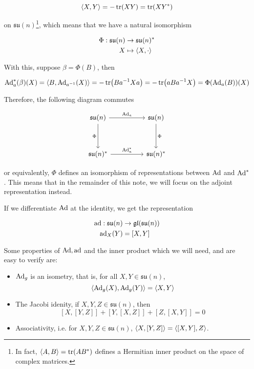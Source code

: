 \documentclass{article}
\newcommand{\su}{\mathfrak{su}}
\begin{document}
\[\left\langle X, Y \right\rangle = -\tr(XY) = \tr(XY^*)\]

on \(\su(n)\)\footnote{In fact, \(\left\langle A, B \right\rangle = \tr(AB^*)\) defines a Hermitian inner product on the space of complex matrices.}, which means that we have a natural isomorphism

\begin{align*}
    \Phi : \su(n) &\to \su(n)^* \\
    X &\mapsto \inner{X, \cdot}
\end{align*}

With this, suppose \(\beta = \Phi(B)\), then

\[\operatorname{Ad}_a^*(\beta)(X) = \left\langle B, \operatorname{Ad}_{a^{-1}}(X) \right\rangle = -\tr(Ba^{-1}Xa) = -\tr(aBa^{-1}X) = \Phi(\operatorname{Ad}_a(B))(X)\]

Therefore, the following diagram commutes

\[\begin{tikzcd}
	{\su(n)} && {\su(n)} \\
	\\
	{\su(n)^*} && {\su(n)^*}
	\arrow["{\Ad_a^*}", from=3-1, to=3-3]
	\arrow["{\Ad_a}", from=1-1, to=1-3]
	\arrow["\Phi"', from=1-1, to=3-1]
	\arrow["\Phi", from=1-3, to=3-3]
\end{tikzcd}\]

or equivalently, \(\Phi\) defines an isomorphism of representations between \(\operatorname{Ad}\) and \(\operatorname{Ad}^*\). This means that in the remainder of this note, we will focus on the adjoint representation instead.

If we differentiate \(\operatorname{Ad}\) at the identity, we get the representation

\begin{align*}
    \ad : \su(n) &\to \gl(\su(n))\\
    \ad_X(Y) &= [X, Y]
\end{align*}

Some properties of \(\operatorname{Ad}, \operatorname{ad}\) and the inner product which we will need, and are easy to verify are:

\begin{itemize}
    \item \(\operatorname{Ad}_g\) is an isometry, that is, for all \(X, Y \in \su(n)\), \[\left\langle \operatorname{Ad}_g(X), \operatorname{Ad}_g(Y) \right\rangle = \left\langle X, Y \right\rangle\]
    \item The Jacobi idenity, if \(X, Y, Z \in \su(n)\), then \[[X, [Y, Z]] + [Y, [X, Z]] + [Z, [X, Y]] = 0\]
    \item Associativity, i.e. for \(X, Y, Z \in \su(n)\), \(\left\langle X, [Y, Z] \right\rangle = \left\langle [X, Y], Z \right\rangle\).
\end{itemize}
\end{document}
